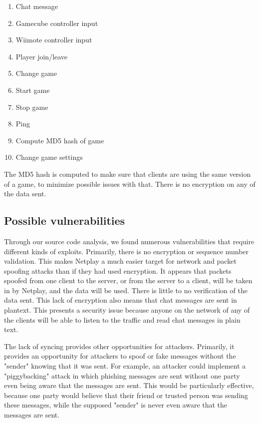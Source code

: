 \documentclass[conference]{IEEEtran}
\begin{document}
\vspace{0.5cm}
\begin{enumerate}  
\item Chat message
\item Gamecube controller input
\item Wiimote controller input
\item Player join/leave
\item Change game
\item Start game
\item Stop game
\item Ping
\item Compute MD5 hash of game
\item Change game settings
\end{enumerate}
\vspace{0.5cm}

The MD5 hash is computed to make sure that clients are using the same version of a game, to minimize possible issues with that.
There is no encryption on any of the data sent.

\subsection{Possible vulnerabilities}
Through our source code analysis, we found numerous vulnerabilities that require different kinds of exploits. 
Primarily, there is no encryption or sequence number validation. 
This makes Netplay a much easier target for network and packet spoofing attacks than if they had used encryption.
It appears that packets spoofed from one client to the server, or from the server to a client, will be taken in by Netplay, and the data will be used.
There is little to no verification of the data sent. 
This lack of encryption also means that chat messages are sent in plantext.
This presents a security issue because anyone on the network of any of the clients will be able to listen to the traffic and read chat messages in plain text.

The lack of syncing provides other opportunities for attackers.
Primarily, it provides an opportunity for attackers to spoof or fake messages without the "sender" knowing that it was sent.
For example, an attacker could implement a "piggybacking" attack in which phishing messages are sent without one party even being aware that the messages are sent.
This would be particularly effective, because one party would believe that their friend or trusted person was sending these messages, while the supposed "sender" is never even aware that the messages are sent.
\end{document}
